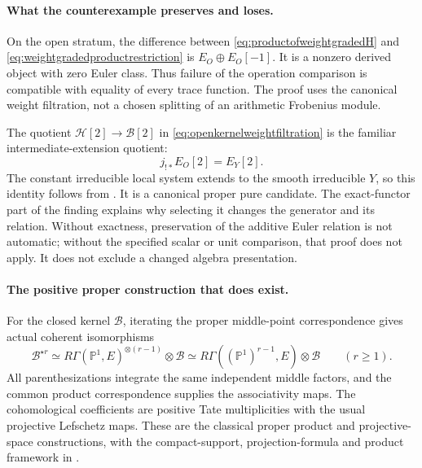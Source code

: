 \documentclass[11pt,a4paper]{article}
\renewcommand{\S}{\ensuremath{\mathsection}}
\theoremstyle{named}\newtheorem{finding}{Finding}[section]
\theoremstyle{definition}\newtheorem{definition}[finding]{Definition}
\theoremstyle{remark}\newtheorem{remark}[finding]{Remark}
\begin{document}
\paragraph{What the counterexample preserves and loses.}
On the open stratum, the difference between
\eqref{eq:productofweightgradedH} and
\eqref{eq:weightgradedproductrestriction} is
\(E_O\oplus E_O[-1]\). It is a nonzero derived object with
zero Euler class. Thus failure of the operation comparison
is compatible with equality of every trace function. The
proof uses the canonical weight filtration, not a chosen
splitting of an arithmetic Frobenius module.

The quotient \(\mathcal H[2]\to\mathcal B[2]\) in
\eqref{eq:openkernelweightfiltration} is the familiar
intermediate-extension quotient:
\[
                        j_{!*}E_O[2]=E_Y[2].
\]
The constant irreducible local system extends to the smooth
irreducible \(Y\), so this identity follows from
\cite[Lemma~4.3.2 and proof, pp.~112--113]{BBD}.
It is a canonical proper pure candidate. The exact-functor
part of the finding explains why selecting it changes the
generator and its relation. Without exactness, preservation
of the additive Euler relation is not automatic; without
the specified scalar or unit comparison, that proof does
not apply. It does not exclude a changed algebra presentation.

\paragraph{The positive proper construction that does exist.}
For the closed kernel \(\mathcal B\), iterating the proper
middle-point correspondence gives actual coherent
isomorphisms
\begin{equation}\label{eq:properclosedkernelpowers}
 \mathcal B^{\star r}
   \simeq R\Gamma(\mathbb P^1,E)^{\otimes(r-1)}
                  \otimes\mathcal B
   \simeq R\Gamma((\mathbb P^1)^{r-1},E)
                  \otimes\mathcal B
       \qquad(r\ge1).
\end{equation}
All parenthesizations integrate the same independent middle
factors, and the common product correspondence supplies
the associativity maps. The cohomological coefficients
are positive Tate multiplicities with the usual projective
Lefschetz maps. These are the classical proper product and
projective-space constructions, with the compact-support,
projection-formula and product framework in
\cite[Theorem~17.10, pp.~116--117; Proposition~18.4,
pp.~121--122; Proposition~22.5, pp.~136--137;
\S23, pp.~138--140]{Milne}.
\end{document}
